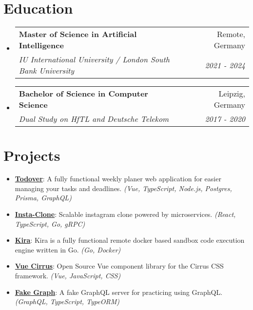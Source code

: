 \documentclass[letterpaper,11pt]{article}
\makeatletter
\newcommand{\resumeItem}[2]{
  \item\small{
    \textbf{#1}{: #2 \vspace{-2pt}}
  }
}
\newcommand{\resumeSubheading}[4]{
  \vspace{-1pt}\item
    \begin{tabular*}{0.97\textwidth}[t]{l@{\extracolsep{\fill}}r}
      \textbf{#1} & #2 \\
      \textit{\small#3} & \textit{\small #4} \\
    \end{tabular*}\vspace{-5pt}
}
\newcommand{\resumeSubItem}[2]{\resumeItem{#1}{#2}\vspace{-4pt}}
\newcommand{\resumeSubHeadingListStart}{\begin{itemize}[leftmargin=*]}
\newcommand{\resumeSubHeadingListEnd}{\end{itemize}}
\makeatother
\begin{document}
\section{Education}
  \resumeSubHeadingListStart
    \resumeSubheading
      {Master of Science in Artificial Intelligence}{Remote, Germany}
      {IU International University / London South Bank University}{2021 - 2024}
    \resumeSubheading
      {Bachelor of Science in Computer Science}{Leipzig, Germany}
      {Dual Study on HfTL and Deutsche Telekom}{2017 - 2020}
  \resumeSubHeadingListEnd


\section{Projects}
  \resumeSubHeadingListStart
    \resumeSubItem{\href{https://github.com/FlorianWoelki/todover}{Todover}}
      {A fully functional weekly planer web application for easier managing your tasks and deadlines.
      \textit{(Vue, TypeScript, Node.js, Postgres, Prisma, GraphQL)}}
    \resumeSubItem{\href{https://github.com/FlorianWoelki/insta-clone}{Insta-Clone}}
      {Scalable instagram clone powered by microservices.
      \textit{(React, TypeScript, Go, gRPC)}}
    \resumeSubItem{\href{https://github.com/FlorianWoelki/kira}{Kira}}
      {Kira is a fully functional remote docker based sandbox code execution engine written in Go.
      \textit{(Go, Docker)}}
    \resumeSubItem{\href{https://github.com/FlorianWoelki/vue-cirrus}{Vue Cirrus}}
      {Open Source Vue component library for the Cirrus CSS framework.
      \textit{(Vue, JavaScript, CSS)}}
    \resumeSubItem{\href{https://github.com/daycademy/fake-graph}{Fake Graph}}
      {A fake GraphQL server for practicing using GraphQL.
      \textit{(GraphQL, TypeScript, TypeORM)}}
  \resumeSubHeadingListEnd
\end{document}
